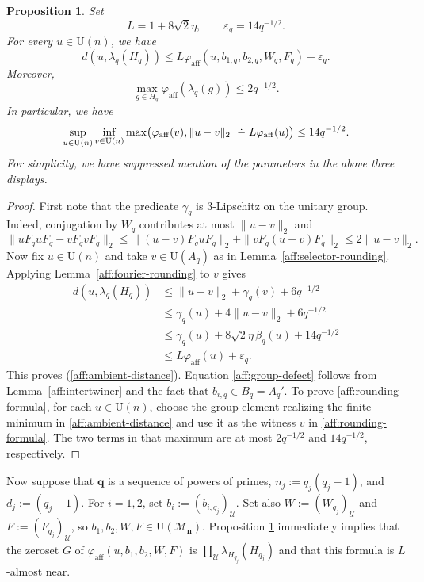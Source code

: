 \documentclass[12pt]{amsart}
\numberwithin{equation}{section}
\newtheorem{prop}[thm]{Proposition}
\theoremstyle{definition}
\newcommand{\dminus}{ 
\buildrel\textstyle\ .\over{\hbox{ 
\vrule height3pt depth0pt width0pt}{\smash-} 
}}
\def\cal{\mathcal}
\def\M{\mathcal{M}}
\newcommand\cU{{\cal U}}
\def \M{\mathcal{M}}
\begin{document}
\begin{prop}
\label{aff:ambient-rounding}
Set
\[
 L=1+8\sqrt2\eta,\qquad \varepsilon_q=14q^{-1/2}.
\]
For every $u\in\mathrm U(n)$, we have
\begin{equation}
\label{aff:ambient-distance}
 d(u,\lambda_q(H_q))\le L\varphi_{\operatorname{aff}}(u,b_{1,q},b_{2,q},W_q,F_q)+\varepsilon_q.
\end{equation}
Moreover,
\begin{equation}
\label{aff:group-defect}
 \max_{g\in H_q}\varphi_{\operatorname{aff}}(\lambda_q(g))\le2q^{-1/2}.
\end{equation}
In particular, we have
\begin{equation}
\label{aff:rounding-formula}
 \sup_{u\in\mathrm U(n)}\inf_{v\in\mathrm U(n)}
 \max\bigl(\varphi_{\operatorname{aff}}(v),
       \|u-v\|_2\dminus L\varphi_{\operatorname{aff}}(u)\bigr)
 \le14q^{-1/2}.
\end{equation}
For simplicity, we have suppressed mention of the parameters in the above three displays.
\end{prop}

\begin{proof}
First note that the predicate $\gamma_q$ is $3$-Lipschitz on the unitary group.
Indeed, conjugation by $W_q$ contributes at most $\|u-v\|_2$
and
\[
 \|uF_quF_q-vF_qvF_q\|_2
 \le\|(u-v)F_quF_q\|_2+\|vF_q(u-v)F_q\|_2
 \le2\|u-v\|_2.
\]
Now fix $u\in \mathrm{U}(n)$ and take $v\in\mathrm U(A_q)$ as in
Lemma~\ref{aff:selector-rounding}.  Applying
Lemma~\ref{aff:fourier-rounding} to $v$ gives
\begin{align*}
 d(u,\lambda_q(H_q))
 &\le \|u-v\|_2+\gamma_q(v)+6q^{-1/2}\\
 &\le \gamma_q(u)+4\|u-v\|_2+6q^{-1/2}\\
 &\le \gamma_q(u)+8\sqrt2\eta\,\beta_q(u)+14q^{-1/2}\\
 &\le L\varphi_{\operatorname{aff}}(u)+\varepsilon_q.
\end{align*}
This proves (\ref{aff:ambient-distance}).  Equation \eqref{aff:group-defect} follows from Lemma~\ref{aff:intertwiner} and the fact that $b_{i,q}\in B_q=A_q'$.  To prove \ref{aff:rounding-formula}, for each $u\in \mathrm{U}(n)$, choose the group element
realizing the finite minimum in \eqref{aff:ambient-distance} and
use it as the witness $v$ in \eqref{aff:rounding-formula}.
The two terms in that maximum are at most $2q^{-1/2}$ and
$14q^{-1/2}$, respectively.
\end{proof}

Now suppose that $\mathbf{q}$ is a sequence of powers of primes, $n_j:=q_j(q_j-1)$, and $d_j:=(q_j-1)$.  For $i=1,2$, set $b_i:=(b_{i,q_j})_\cU$.  Set also $W:=(W_{q_j})_\cU$ and $F:=(F_{q_j})_\cU$, so $b_1,b_2,W,F\in \mathrm{U}(\M_{\mathbf{n}})$.  Proposition \ref{aff:ambient-rounding} immediately implies that the zeroset $G$ of $\varphi_{\operatorname{aff}}(u,b_1,b_2,W,F)$ is $\prod_\cU \lambda_{H_{q_j}}(H_{q_j})$ and that this formula is $L$-almost near.  
\end{document}
